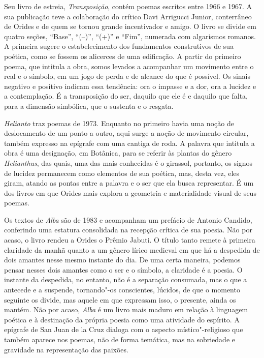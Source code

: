 Seu livro de estreia, \emph{Transposição}, contém poemas escritos entre
1966 e 1967. A sua publicação teve a colaboração do crítico Davi
Arrigucci Junior, conterrâneo de Orides e de quem se tornou grande
incentivador e amigo. O livro se divide em quatro seções, ``Base'',
``(--)'', ``(+)'' e ``Fim'', numerada com algarismos romanos. A primeira
sugere o estabelecimento dos fundamentos construtivos de sua poética,
como se fossem os alicerces de uma edificação. A partir do primeiro
poema, que intitula a obra, somos levados a acompanhar um movimento
entre o real e o símbolo, em um jogo de perda e de alcance do que é
possível. Os sinais negativo e positivo indicam essa tendência: ora o
impasse e a dor, ora a lucidez e a contemplação. É a transposição do
ser, daquilo que ele é e daquilo que falta, para a dimensão simbólica,
que o sustenta e o resgata.

\emph{Helianto} traz poemas de 1973. Enquanto no primeiro havia uma
noção de deslocamento de um ponto a outro, aqui surge a noção de
movimento circular, também expresso na epígrafe com uma cantiga de roda.
A palavra que intitula a obra é uma designação, em Botânica, para se
referir às plantas do gênero \emph{Helianthus}, das quais, uma das mais
conhecidas é o girassol, portanto, os signos de lucidez permanecem como
elementos de sua poética, mas, desta vez, eles giram, atando as pontas
entre a palavra e o ser que ela busca representar. É um dos livros em
que Orides mais explora a geometria e materialidade visual de seus
poemas.

Os textos de \emph{Alba} são de 1983 e acompanham um prefácio de Antonio
Candido, conferindo uma estatura consolidada na recepção crítica de sua
poesia. Não por acaso, o livro rendeu a Orides o Prêmio Jabuti. O título
tanto remete à primeira claridade da manhã quanto a um gênero lírico
medieval em que há a despedida de dois amantes nesse mesmo instante do
dia. De uma certa maneira, podemos pensar nesses dois amantes como o ser
e o símbolo, a claridade é a poesia. O instante da despedida, no
entanto, não é a separação consumada, mas o que a antecede e a suspende,
tornando"-os conscientes, lúcidos, de que o momento seguinte os divide,
mas aquele em que expressam isso, o presente, ainda os mantém. Não por
acaso, \emph{Alba} é um livro mais maduro em relação à linguagem poética
e à destinação da própria poesia como uma atividade do espírito. A
epígrafe de San Juan de la Cruz dialoga com o aspecto místico"-religioso
que também aparece nos poemas, não de forma temática, mas na sobriedade
e gravidade na representação das paixões.

